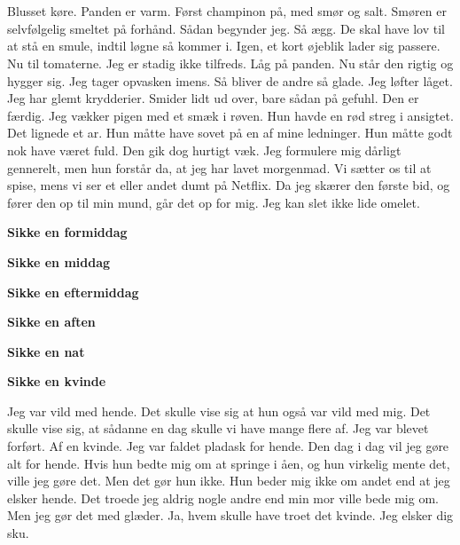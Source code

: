 \documentclass[]{article}
\begin{document}
\\ \\ 
Blusset køre. Panden er varm. Først champinon på, med smør og salt. Smøren er selvfølgelig smeltet på forhånd. Sådan begynder jeg. Så ægg. De skal have lov til at stå en smule, indtil løgne så kommer i. Igen, et kort øjeblik lader sig passere. Nu til tomaterne. Jeg er stadig ikke tilfreds. Låg på panden. Nu står den rigtig og hygger sig. Jeg tager opvasken imens. Så bliver de andre så glade. Jeg løfter låget. Jeg har glemt krydderier. Smider lidt ud over, bare sådan på gefuhl. Den er færdig. Jeg vækker pigen med et smæk i røven. Hun havde en rød streg i ansigtet. Det lignede et ar. Hun måtte have sovet på en af mine ledninger. Hun måtte godt nok have været fuld. Den gik dog hurtigt væk. Jeg formulere mig dårligt gennerelt, men hun forstår da, at jeg har lavet morgenmad. Vi sætter os til at spise, mens vi ser et eller andet dumt på Netflix. Da jeg skærer den første bid, og fører den op til min mund, går det op for mig. Jeg kan slet ikke lide omelet.

\begin{center}
	\large\textbf{Sikke en formiddag}
\end{center}

\begin{center}
	\large\textbf{Sikke en middag}
\end{center}

\begin{center}
	\large\textbf{Sikke en eftermiddag}
\end{center}

\begin{center}
	\large\textbf{Sikke en aften}
\end{center}

\begin{center}
	\large\textbf{Sikke en nat}
\end{center}

\begin{center}
	\large\textbf{Sikke en kvinde}
\end{center}

Jeg var vild med hende. Det skulle vise sig at hun også var vild med mig. Det skulle vise sig, at sådanne en dag skulle vi have mange flere af. Jeg var blevet forført. Af en kvinde. Jeg var faldet pladask for hende. Den dag i dag vil jeg gøre alt for hende. Hvis hun bedte mig om at springe i åen, og hun virkelig mente det, ville jeg gøre det. Men det gør hun ikke. Hun beder mig ikke om andet end at jeg elsker hende. Det troede jeg aldrig nogle andre end min mor ville bede mig om. Men jeg gør det med glæder. Ja, hvem skulle have troet det kvinde. Jeg elsker dig sku.
\end{document}
